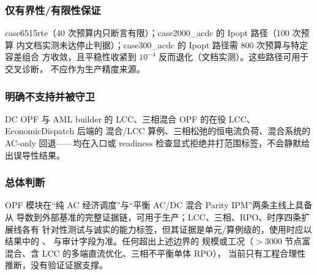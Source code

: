 \subsubsection*{仅有界性/有限性保证}
case6515rte（40 次预算内只断言有限）；case2000\_acdc 的 Ipopt 路径（100 次预算
内文档实测未达停止判据）；case300\_acdc 的 Ipopt 路径需 800 次预算与特定容差组合
方收敛，且平稳性收紧到 $10^{-4}$ 反而退化（文档实测）。这些路径可用于交叉诊断，
不应作为生产精度来源。

\subsubsection*{明确不支持并被守卫}
DC OPF 与 AML builder 的 LCC、三相混合 OPF 的在役 LCC、EconomicDispatch 后端的
混合/LCC 算例、三相松弛的恒电流负荷、混合系统的 AC-only 回退——均在入口或
readiness 检查显式拒绝并打范围标签，不会静默给出误导性结果。

\subsubsection*{总体判断}
OPF 模块在“纯 AC 经济调度”与“平衡 AC/DC 混合 Parity IPM”两条主线上具备从
导数到外部基准的完整证据链，可用于生产；LCC、三相、RPO、时序四条扩展线各有
针对性测试与诚实的能力标签，但其证据是单元/算例级的，使用时应以结果中的
、 与审计字段为准。任何超出上述边界的
规模或工况（$>3000$ 节点富混合、含 LCC 的多端直流优化、三相不平衡单体 RPO），
当前只有工程合理性推断，没有验证证据支撑。
